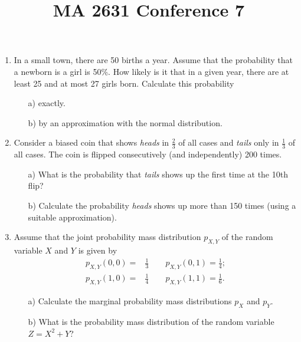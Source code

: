 \documentclass{article}
\title{MA 2631 Conference 7}
\begin{document}
\maketitle



\begin{enumerate}

\item

In a small town, there are 50 births a year. Assume that the probability that a newborn is a girl is 50\%. How likely is it that in a given year, there are at least 25 and at most 27 girls born. Calculate this probability
\begin{itemize}
	\item[a)] exactly.
	\item[b)] by an approximation with the normal distribution.
\end{itemize}


\item
Consider a biased coin that shows {\em heads} in $\frac{2}{3}$ of all cases and {\em tails} only in $\frac{1}{3}$ of all cases. The coin is flipped consecutively (and independently) 200 times. 
\begin{itemize}
	\item[a)] What is the probability that {\em tails} shows up the first time at the 10th flip?
	\item[b)] Calculate the probability  {\em heads}  shows up more than 150 times (using a suitable approximation). 

\end{itemize}

\item 

Assume that the joint probability mass distribution $p_{X,Y}$ of the random variable $X$ and $Y$ is given by
\begin{align*}
p_{X,Y}(0,0) =& \frac{1}{3} \qquad p_{X,Y}(0,1)= \frac{1}{4};\\
p_{X,Y}(1,0) =& \frac{1}{4} \qquad  p_{X,Y}(1,1) = \frac{1}{6}.
\end{align*}

\begin{itemize}
	\item[a)] Calculate the marginal probability mass distributions $p_X$ and $p_Y$.
	\item[b)] What is the probability mass distribution of the random variable $Z = X^2 + Y$?
\end{itemize}


\end{enumerate}
\end{document}

